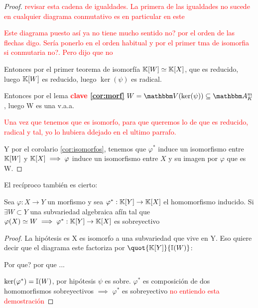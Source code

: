 \begin{proof}
\textcolor{red}{revisar esta cadena de igualdades. La primera de las igualdades no sucede en cualquier diagrama conmutativo es en particular en este}


\textcolor{red}{Este diagrama puesto así ya no tiene mucho sentido no? por el orden de las flechas digo. Sería ponerlo en el orden habitual y por el primer tma de isomorfia si conmutaria no?. Pero dijo que no}

Entonces por el primer teorema de isomorfía
$\mathbb{K}[W] \simeq \mathbb{K}[X]$, que es reducido, luego $\mathbb{K}[W]$ es reducido, luego $\ker(\psi)$ es radical.

Entonces por el lema \textcolor{red}{\textbf{clave \ref{cor:morf}}} $W=\V(\ker(\psi)) \subseteq \A_K^m$, luego W es una v.a.a.

\textcolor{red}{Una vez que tenemos que es isomorfo, para que queremos lo de que es reducido, radical y tal, yo lo hubiera ddejado en el ultimo parrafo.}

Y por el corolario \ref{cor:isomorfos}, tenemos que $\varphi^*$ induce un isomorfismo entre $\mathbb{K}[W]$ y $\mathbb{K}[X] \implies \varphi$ induce un isomorfismo entre $X$ y su imagen por $\varphi$ que es W.

\end{proof}

El recíproco también es cierto:


\begin{lemma}
	Sea $\varphi: X \rightarrow Y$ un morfismo y sea $\varphi^*: \mathbb{K}[Y]\rightarrow \mathbb{K}[X]$ el homomorfismo inducido. Si $\exists W \subset Y$ una subvariedad algebraica afín tal que $\varphi(X) \simeq W \implies \varphi^*:\mathbb{K}[Y] \rightarrow \mathbb{K}[X]$ es sobreyectivo
\end{lemma}

\begin{proof}
	La hipótesis es X es isomorfo a una subvariedad que vive en Y. Eso quiere decir que el diagrama este factoriza por $\quot{\K[Y]}{\I(W)}$:


	Por que? por que ...

	$\ker(\varphi^*)=\mathbb{I}(W)$, por hipótesis $\psi$ es sobre. $\varphi^*$ es composición de dos homomorfismos sobreyectivos $\implies$ $\varphi^*$ es sobreyectivo \textcolor{red}{no entiendo esta demostración}

\end{proof}

